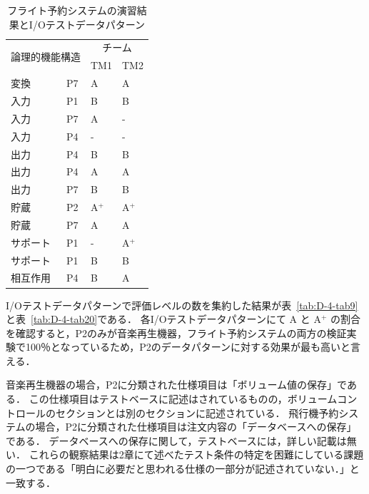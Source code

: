 \begin{table}[htbp]
  \centering
\caption{フライト予約システムの演習結果とI/Oテストデータパターン}
    \begin{tabular}{|l|l|l|l|}
    \hline
    \multicolumn{2}{|c|}{\multirow{2}[4]{*}{論理的機能構造}} & \multicolumn{2}{c|}{チーム} \bigstrut\\
\cline{3-4}    \multicolumn{2}{|c|}{} & TM1   & TM2 \bigstrut\\
    \hline
    \hline
    変換 & P7    & A     & A \bigstrut\\
    \hline
    入力 & P1    & B     & B \bigstrut\\
    \hline
    入力 & P7    & A     & - \bigstrut\\
    \hline
    入力 & P4    & -     & - \bigstrut\\
    \hline
    出力 & P4    & B     & B \bigstrut\\
    \hline
    出力 & P4    & A     & A \bigstrut\\
    \hline
    出力 & P7    & B     & B \bigstrut\\
    \hline
    貯蔵 & P2    & A${}^\text{+}$    & A${}^\text{+}$ \bigstrut\\
    \hline
    貯蔵 & P7    & A     & A \bigstrut\\
    \hline
    サポート & P1    & -     & A${}^\text{+}$ \bigstrut\\
    \hline
    サポート & P1    & B     & B \bigstrut\\
    \hline
    相互作用 & P4    & B     & A \bigstrut\\
    \hline
    \end{tabular}%
\label{tab:D-4-tab8}%
\end{table}%

I/Oテストデータパターンで評価レベルの数を集約した結果が表~\ref{tab:D-4-tab9}と表~\ref{tab:D-4-tab20}である．
各I/Oテストデータパターンにて A と A${}^\text{+}$ の割合を確認すると，P2のみが音楽再生機器，フライト予約システムの両方の検証実験で100％となっているため，P2のデータパターンに対する効果が最も高いと言える．

音楽再生機器の場合，P2に分類された仕様項目は「ボリューム値の保存」である．
この仕様項目はテストベースに記述はされているものの，ボリュームコントロールのセクションとは別のセクションに記述されている．
飛行機予約システムの場合，P2に分類された仕様項目は注文内容の「データベースへの保存」である．
データベースへの保存に関して，テストベースには，詳しい記載は無い．
これらの観察結果は2章にて述べたテスト条件の特定を困難にしている課題の一つである「明白に必要だと思われる仕様の一部分が記述されていない．」と一致する．

